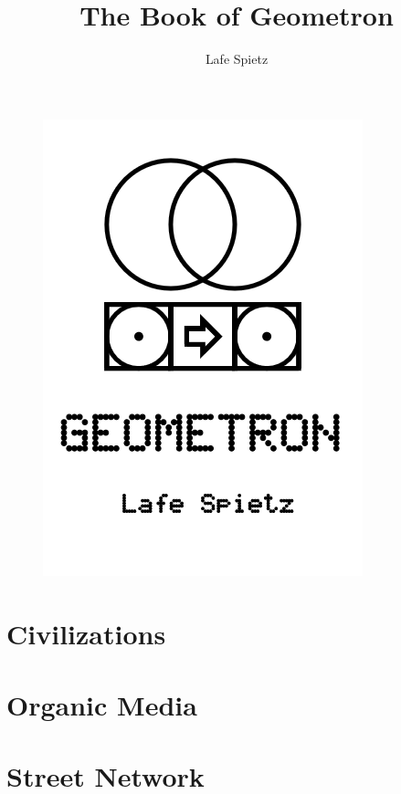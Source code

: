 \documentclass[ebook,12pt,openany]{memoir} %
\title{The Book of Geometron}
\author{Lafe Spietz}
\begin{document}
\frontmatter
\begin{figure}[htbp]
\centering
\includegraphics{cover2.png}
\end{figure}

\clearpage

\clearpage

\newpage
\thispagestyle{empty}
\mbox{}

\maketitle

\tableofcontents

\listoffigures 

%

\mainmatter

\chapter{Civilizations}

\chapter{Organic Media}

\chapter{Street Network}

\end{document}
